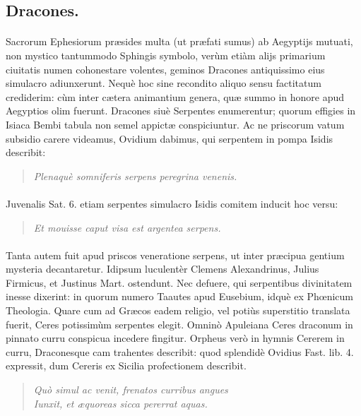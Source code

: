 \documentclass[a4paper, 11pt, oneside, polutonikogreek, latin]{article}
\begin{document}
\subsection{Dracones.}
\paragraph{}
Sacrorum Ephesiorum præsides multa (ut præfati sumus) ab Aegyptijs mutuati, non mystico tantummodo Sphingis symbolo, verùm etiàm alijs primarium ciuitatis numen cohonestare volentes, geminos Dracones antiquissimo eius simulacro adiunxerunt. Nequè hoc sine recondito aliquo sensu factitatum crediderim: cùm inter cætera animantium genera, quæ summo in honore apud Aegyptios olim fuerunt. Dracones siuè Serpentes enumerentur; quorum effigies in Isiaca Bembi tabula non semel appictæ conspiciuntur. Ac ne priscorum vatum subsidio carere videamus, Ovidium dabimus, qui serpentem in pompa Isidis describit:
\begin{quote}
\emph{Plenaquè somniferis serpens peregrina venenis.}
\end{quote}
\vspace*{-4mm}
\paragraph{}
Juvenalis Sat. 6. etiam serpentes simulacro Isidis comitem inducit hoc versu:
\begin{quote}
\emph{Et mouisse caput visa est argentea serpens.}
\end{quote}
\vspace*{-4mm}
\paragraph{}
Tanta autem fuit apud priscos veneratione serpens, ut inter præcipua gentium mysteria decantaretur. Idipsum luculentèr Clemens Alexandrinus, Julius Firmicus, et Justinus Mart. ostendunt. Nec defuere, qui serpentibus divinitatem inesse dixerint: in quorum numero Taautes apud Eusebium, idquè ex Phœnicum Theologia. Quare cum ad Græcos eadem religio, vel potiùs superstitio translata fuerit, Ceres potissimùm serpentes elegit. Omninò Apuleiana Ceres draconum in pinnato curru conspicua incedere fingitur. Orpheus verò in hymnis Cererem in curru, Draconesque cam trahentes describit: quod splendidè Ovidius Fast. lib. 4. expressit, dum Cereris ex Sicilia profectionem describit.
\begin{quote}
\emph{Quò simul ac venit, frenatos curribus angues}\\
\hspace*{10mm}\emph{Iunxit, et æquoreas sicca pererrat aquas.}\\
\end{quote}
\vspace*{-8mm}
\end{document}
